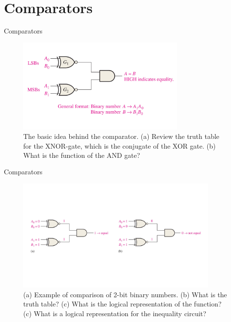 \documentclass{beamer}
\begin{document}
\section{Comparators}

\begin{frame}{Comparators}
\begin{figure}
\centering
\includegraphics[width=0.75\textwidth]{figures/comparator1.pdf}
\caption{\label{fig:comparator1} The basic idea behind the comparator.  (a) Review the truth table for the XNOR-gate, which is the conjugate of the XOR gate. (b) What is the function of the AND gate?}
\end{figure}
\end{frame}

\begin{frame}{Comparators}
\begin{figure}
\centering
\includegraphics[width=0.9\textwidth,trim=0cm 3cm 0cm 3cm,clip=true]{figures/comparator2.pdf}
\caption{\label{fig:comparator2} (a) Example of comparison of 2-bit binary numbers.  (b) What is the truth table? (c) What is the logical representation of the function?  (c) What is a logical representation for the inequality circuit?}
\end{figure}
\end{frame}
\end{document}
